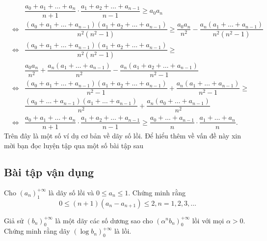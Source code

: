 {			\begin{eqnarray*}
				& & \dfrac{a_0 + a_1 + \ldots + a_n}{n+1} \cdot \dfrac{a_1+a_2+\ldots+a_{n-1}}{n-1} \ge a_0 a_n	\\
				& \Leftrightarrow & \dfrac{\left( a_0 + a_1 + \ldots + a_{n-1} \right) \left( a_1 + a_2 + \ldots + a_{n-1} \right)}{n^2 \left(n^2-1\right)}  \ge \dfrac{a_0 a_n }{n^2} - \dfrac{a_n \left( a_1+ \ldots + a_{n-1} \right)}{n^2 \left(n^2-1\right)}\\
				& \Leftrightarrow & \dfrac{\left( a_0 + a_1 + \ldots + a_{n-1} \right) \left( a_1 + a_2 + \ldots + a_{n-1} \right)}{n^2 \left(n^2-1\right)} \ge\\
				& &  \dfrac{a_0 a_n }{n^2} + \dfrac{a_n \left( a_1 + \ldots + a_{n-1} \right)}{n^2} - \dfrac{a_n \left( a_1 + a_2 + \ldots + a_{n-1} \right)}{n^2-1}\\
				& \Leftrightarrow & \dfrac{\left( a_0 + a_1 + \ldots + a_{n-1} \right) \left( a_1 + a_2 + \ldots + a_{n-1} \right)}{n^2-1} + \dfrac{a_n \left( a_1 + \ldots + a_{n-1} \right)}{n^2-1} \ge \\
				& &  \dfrac{\left( a_0+\ldots+a_{n-1} \right) \left( a_1+\ldots+a_{n-1} \right)}{n^2} + \dfrac{a_n \left( a_0+\ldots+a_{n-1} \right)}{n^2}\\
				& \Leftrightarrow & \dfrac{a_0 + a_1 + \ldots + a_n}{n+1} \cdot \dfrac{a_1 + a_2 +\ldots + a_{n-1}}{n-1} \ge \dfrac{a_0 + \ldots + a_{n-1}}{n} \cdot \dfrac{a_1 + \ldots + a_n}{n}.		
			\end{eqnarray*}
		}
		Trên đây là một số ví dụ cơ bản về dãy số lồi. Để hiểu thêm về vấn đề này xin mời bạn đọc luyện tập qua một số bài tập sau
		
		\subsection{Bài tập vận dụng}
		\begin{bt}[IMO SL, 1975]%
			Cho $\left(a_n\right)_1^{+\infty}$ là dãy số lồi và $0 \le a_n \le 1$. Chứng minh rằng $$0 \le (n+1)\left(a_n-a_{n+1}\right) \le 2, n=1,2,3,\ldots$$
		\end{bt}
		
		\begin{bt}[IMO LL, 1978]%
			Giả sử $\left(b_n\right)_0^{+\infty}$ là một dãy các số dương sao cho $\left(\alpha ^n b_n\right)_0^{+\infty}$ lồi với mọi $\alpha >0$. Chứng minh rằng dãy $\left(\log b_n\right)_0^{+\infty}$ là lồi.
		\end{bt}
		
